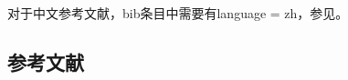 对于中文参考文献，bib条目中需要有language = {zh}，参见\cite{test2}。

\begin{REF}
\subsection*{参考文献}
\vspace{-50pt}

\end{REF}

\newpage%
